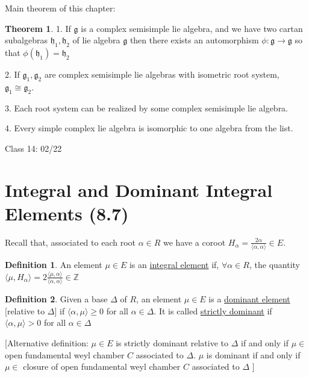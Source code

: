 \documentclass{article}
\theoremstyle{definition}
\newtheorem{definition}{Definition}
\newtheorem{theorem}{Theorem}
\begin{document}
Main theorem of this chapter:

\begin{theorem}
    1. If \(\mathfrak{g} \) is a complex semisimple lie algebra, and we have two cartan subalgebras \(\mathfrak{h}_1,\mathfrak{h}_2\) of lie algebra \(\mathfrak{g}\) then there exists an automorphism \(\phi: \mathfrak{g}\to \mathfrak{g} \) so that \(\phi(\mathfrak{h}_1 ) = \mathfrak{h}_2 \)
    
    2. If \(\mathfrak{g}_1,\mathfrak{g}_2\) are complex semisimple lie algebras with isometric root system, \(\mathfrak{g}_1\cong \mathfrak{g}_2 \).
    
    3. Each root system can be realized by some complex semisimple lie algebra.

    4. Every simple complex lie algebra is isomorphic to one algebra from the list.
\end{theorem}

\hrulefill

Class 14: 02/22

\section*{Integral and Dominant Integral Elements (8.7)}

Recall that, associated to each root \(\alpha \in R\) we have a coroot \(H_\alpha = \frac{2\alpha}{\langle \alpha ,\alpha \rangle }\in E\).

\begin{definition}
    An element \(\mu\in E\) is an \underline{integral element} if, \(\forall \alpha \in R\), the quantity \(\langle \mu , H_\alpha \rangle = 2 \frac{\langle \mu ,\alpha  \rangle }{\langle \alpha ,\alpha  \rangle }\in \mathbb{Z} \) 
\end{definition}

\begin{definition}
    Given a base \(\Delta\) of \(R\), an element \(\mu\in E\) is a \underline{dominant element} [relative to \(\Delta\)] if \(\langle \alpha ,\mu  \rangle \geq 0\) for all \(\alpha \in \Delta \). It is called \underline{strictly dominant} if \(\langle \alpha ,\mu  \rangle > 0\) for all \(\alpha \in \Delta \) 
\end{definition}

[Alternative definition: \(\mu \in E\) is strictly dominant relative to \(\Delta\)  if and only if \(\mu\in\) open fundamental weyl chamber \(C\) associated to \(\Delta\). \(\mu\) is dominant if and only if \(\mu\in\) closure of open fundamental weyl chamber \(C\) associated to \(\Delta \) ]
\end{document}
